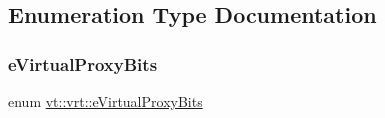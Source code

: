 \subsection{Enumeration Type Documentation}
\mbox{\label{namespacevt_1_1vrt_a408950d7781cc0422dcc4bdf723fc281}} 
\subsubsection{\texorpdfstring{e\+Virtual\+Proxy\+Bits}{eVirtualProxyBits}}
{\footnotesize\ttfamily enum \hyperlink{namespacevt_1_1vrt_a408950d7781cc0422dcc4bdf723fc281}{vt\+::vrt\+::e\+Virtual\+Proxy\+Bits}}

